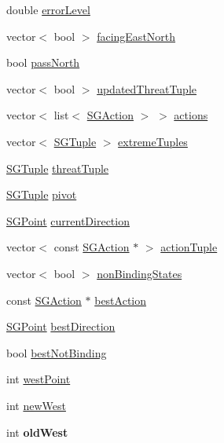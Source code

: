 \begin{DoxyCompactItemize}
double \hyperlink{classSGApprox_aee816ed49535cfc211aa34d0e6064e01}{error\-Level}
\item 
vector$<$ bool $>$ \hyperlink{classSGApprox_a44ce2e0eba77e1c7c155f38662cba9d0}{facing\-East\-North}
\item 
bool \hyperlink{classSGApprox_aec0377b26f0efaea314f72554a8862b9}{pass\-North}
\item 
vector$<$ bool $>$ \hyperlink{classSGApprox_ae680fd19d6a65aecee81dffeba8e8595}{updated\-Threat\-Tuple}
\item 
vector$<$ list$<$ \hyperlink{classSGAction}{S\-G\-Action} $>$ $>$ \hyperlink{classSGApprox_a0fccecf0f5dbe7e9288e47182f180879}{actions}
\item 
vector$<$ \hyperlink{classSGTuple}{S\-G\-Tuple} $>$ \hyperlink{classSGApprox_ab0e2c4678401f806922ac64667ad5ff6}{extreme\-Tuples}
\item 
\hyperlink{classSGTuple}{S\-G\-Tuple} \hyperlink{classSGApprox_a69815072fd57ec5b6b137dc839371ec7}{threat\-Tuple}
\item 
\hyperlink{classSGTuple}{S\-G\-Tuple} \hyperlink{classSGApprox_a037c73ff2b6ff8a55fadf57bb0a6a546}{pivot}
\item 
\hyperlink{classSGPoint}{S\-G\-Point} \hyperlink{classSGApprox_ac5bf5f2eba2d65c8a9933b6d74f0cd47}{current\-Direction}
\item 
vector$<$ const \hyperlink{classSGAction}{S\-G\-Action} $\ast$ $>$ \hyperlink{classSGApprox_a507eb6895c5a99c5d1efba8107989187}{action\-Tuple}
\item 
vector$<$ bool $>$ \hyperlink{classSGApprox_ac05d3697e39d0f671858fd9936581820}{non\-Binding\-States}
\item 
const \hyperlink{classSGAction}{S\-G\-Action} $\ast$ \hyperlink{classSGApprox_a9769774aa8829e1e5adec2e4a2bb35ae}{best\-Action}
\item 
\hyperlink{classSGPoint}{S\-G\-Point} \hyperlink{classSGApprox_a20454173d5c9af9bd24870d97f4e2b91}{best\-Direction}
\item 
bool \hyperlink{classSGApprox_ac1a670470711fd81c00aba76d8213ade}{best\-Not\-Binding}
\item 
int \hyperlink{classSGApprox_aa0c6296f28ce5527edc9829e4d9c23a1}{west\-Point}
\item 
int \hyperlink{classSGApprox_aed002d6e06e7199e10b3ac4f27b6cb6c}{new\-West}
\item 
\hypertarget{classSGApprox_a130b9dc6e354a70a0f3cf08c5a511c99}{int {\bfseries old\-West}}\label{classSGApprox_a130b9dc6e354a70a0f3cf08c5a511c99}

\end{DoxyCompactItemize}
